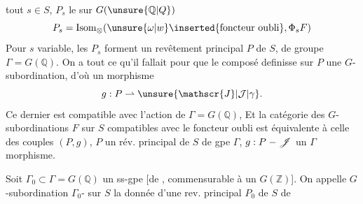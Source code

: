 tout $s\in S$, $P_s$ le  sur $G(\unsure{\mathbb{Q}|Q})$
\[
 P_s=\operatorname{Isom}_{\otimes}(\unsure{\omega|w}\inserted{\text{foncteur oubli}},\Phi_sF)
\]
Pour $s$ variable, les $P_s$ forment un revêtement principal  $P$ de $S$, de groupe $\Gamma=G(\mathbb{Q})$. On a tout ce qu'il fallait pour que le \unsure{$\otimes$} composé
 definisse sur $P$ une $G$-subordination, d'où un morphisme
\[
 g:P\rightharpoonup\unsure{\mathscr{J}|\mathcal{J}|\gamma}.
\]
 Ce dernier est compatible avec l'action de $\Gamma=G(\mathbb{Q})$,  Et la catégorie des  $G$-subordinations $F$ sur $S$ compatibles avec le foncteur oubli est équivalente à celle des couples $(P,g)$, $P$ un rév. principal de $S$ de gpe $\Gamma$, $g:P\relbar\mathscr{J}$ un $\Gamma$ morphisme.

Soit $\Gamma_0\subset\Gamma=G(\mathbb{Q})$ un ss-gpe [de , commensurable à un $G(\mathbb{Z})$]. On appelle $G$-subordination $\Gamma_0$- sur $S$ la donnée d'une rev. principal $P_0$ de $S$ de

